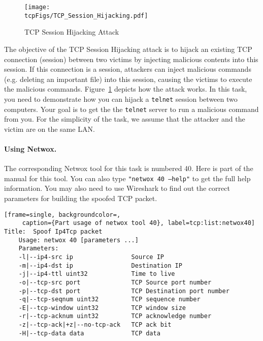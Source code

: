 \begin{figure}[htb]
  \begin{center}
    \texttt{[image: \\tcpFigs/TCP\_Session\_Hijacking.pdf]}
  \end{center}
  \caption{TCP Session Hijacking Attack}
  \label{tcp:fig:hijacking}
\end{figure}
 
   
The objective of the TCP Session Hijacking attack is to hijack an 
existing TCP connection (session) between two victims by injecting malicious contents
into this session. If this connection is a \telnet session, attackers
can inject malicious commands (e.g. deleting an important file) 
into this session, causing the victims 
to execute the malicious commands. 
Figure~\ref{tcp:fig:hijacking} depicts how the attack works.
In this task, you need to demonstrate how you can hijack a 
\texttt{telnet} session between two computers. Your goal is to get the
the \texttt{telnet} server to run a malicious command from you.
For the simplicity of the task, we assume that 
the attacker and the victim are on the same LAN.




\paragraph{Using Netwox.}
The corresponding Netwox tool for this task is numbered 40. Here is part of
the manual for this tool. You can also type {\tt "netwox 40 --help"}
to get the full help information. You may also need to use Wireshark
to find out the correct parameters for building the spoofed TCP packet.

\begin{lstlisting}[frame=single, backgroundcolor=,
     caption={Part usage of netwox tool 40}, label=tcp:list:netwox40]
Title:  Spoof Ip4Tcp packet   
    Usage: netwox 40 [parameters ...]
    Parameters:
    -l|--ip4-src ip                Source IP      
    -m|--ip4-dst ip                Destination IP    
    -j|--ip4-ttl uint32            Time to live 
    -o|--tcp-src port              TCP Source port number    
    -p|--tcp-dst port              TCP Destination port number    
    -q|--tcp-seqnum uint32         TCP sequence number
    -E|--tcp-window uint32         TCP window size
    -r|--tcp-acknum uint32         TCP acknowledge number 
    -z|--tcp-ack|+z|--no-tcp-ack   TCP ack bit
    -H|--tcp-data data             TCP data
\end{lstlisting}



